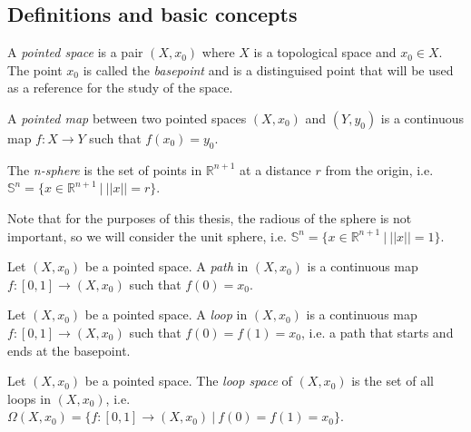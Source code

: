 \documentclass[12pt]{article}
\begin{document}
\subsection{Definitions and basic concepts}

\begin{definition}
	A \textit{pointed space} is a pair \((X, x_0)\) where \(X\) is a topological space and \(x_0 \in X\). The point \(x_0\) is called the \textit{basepoint} and is a distinguised point that will be used as a reference for the study of the space.
\end{definition}

\begin{definition}
	A \textit{pointed map} between two pointed spaces \((X, x_0)\) and \((Y, y_0)\) is a continuous map \(f: X \rightarrow Y\) such that \(f(x_0) = y_0\).
\end{definition}

\begin{definition}
	The \textit{n-sphere} is the set of points in \(\mathbb{R}^{n+1}\) at a distance \(r\) from the origin, i.e. \(\mathbb{S}^n = \{x \in \mathbb{R}^{n+1} \ | \ ||x|| = r\}\).
\end{definition}

Note that for the purposes of this thesis, the radious of the sphere is not important, so we will consider the unit sphere, i.e. \(\mathbb{S}^n = \{x \in \mathbb{R}^{n+1} \ | \ ||x|| = 1\}\).

\begin{definition}[Path]
	Let \((X, x_0)\) be a pointed space. A \textit{path} in \((X, x_0)\) is a continuous map \(f: [0,1] \rightarrow (X, x_0)\) such that \(f(0) = x_0\).
\end{definition}

\begin{definition}[Loop]
	Let \((X, x_0)\) be a pointed space. A \textit{loop} in \((X, x_0)\) is a continuous map \(f: [0,1] \rightarrow (X, x_0)\) such that \(f(0) = f(1) = x_0\), i.e. a path that starts and ends at the basepoint.
\end{definition}

\begin{definition}
	Let \((X, x_0)\) be a pointed space. The \textit{loop space} of \((X, x_0)\) is the set of all loops in \((X, x_0)\), i.e. \(\Omega(X, x_0) = \{f: [0,1] \rightarrow (X, x_0) \ | \ f(0) = f(1) = x_0\}\).
\end{definition}
\end{document}
